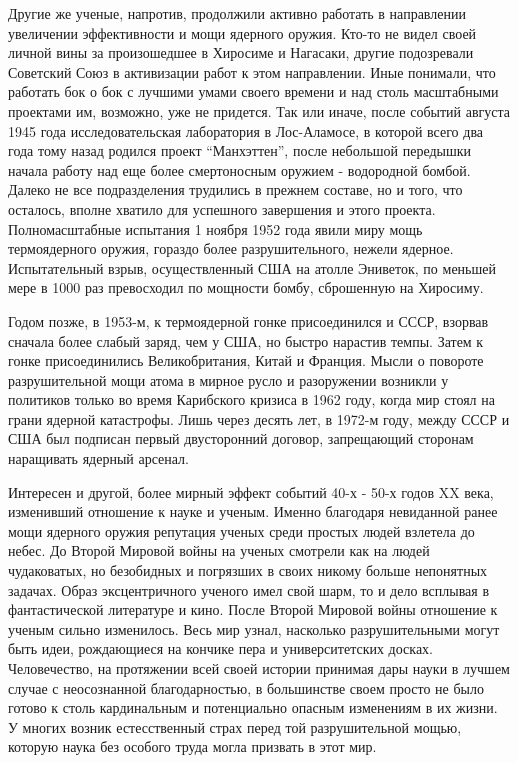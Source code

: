 Другие же ученые, напротив, продолжили активно работать в направлении увеличении эффективности и мощи ядерного оружия.
Кто-то не видел своей личной вины за произошедшее в Хиросиме и Нагасаки, другие подозревали Советский Союз в активизации работ к этом направлении.
Иные понимали, что работать бок о бок с лучшими умами своего времени и над столь масштабными проектами им, возможно, уже не придется. 
Так или иначе, после событий августа 1945 года исследовательская лаборатория в Лос-Аламосе, в которой всего два года тому назад родился проект ``Манхэттен'', после небольшой передышки начала работу над еще более смертоносным оружием - водородной бомбой.
Далеко не все подразделения трудились в прежнем составе, но и того, что осталось, вполне хватило для успешного завершения и этого проекта. 
Полномасштабные испытания 1 ноября 1952 года явили миру мощь термоядерного оружия, гораздо более разрушительного, нежели ядерное.
Испытательный взрыв, осуществленный США на атолле Эниветок, по меньшей мере в 1000 раз превосходил по мощности бомбу, сброшенную на Хиросиму.

Годом позже, в 1953-м, к термоядерной гонке присоединился и СССР, взорвав сначала более слабый заряд, чем у США, но быстро нарастив темпы. 
Затем к гонке присоединились Великобритания, Китай и Франция.
Мысли о повороте разрушительной мощи атома в мирное русло и разоружении возникли у политиков только во время Карибского кризиса в 1962 году, когда мир стоял на грани ядерной катастрофы. 
Лишь через десять лет, в 1972-м году, между СССР и США был подписан первый двусторонний договор, запрещающий сторонам наращивать ядерный арсенал.

Интересен и другой, более мирный эффект событий 40-х - 50-х годов XX века, изменивший отношение к науке и ученым.
Именно благодаря невиданной ранее мощи ядерного оружия репутация ученых среди простых людей взлетела до небес. 
До Второй Мировой войны на ученых смотрели как на людей чудаковатых, но безобидных и погрязших в своих никому больше непонятных задачах. 
Образ эксцентричного ученого имел свой шарм, то и дело всплывая в фантастической литературе и кино.
После Второй Мировой войны отношение к ученым сильно изменилось.
Весь мир узнал, насколько разрушительными могут быть идеи, рождающиеся на кончике пера и университетских досках.
Человечество, на протяжении всей своей истории принимая дары науки в лучшем случае с неосознанной благодарностью, в большинстве своем просто не было готово к столь кардинальным и потенциально опасным изменениям в их жизни.
У многих возник естесственный страх перед той разрушительной мощью, которую наука без особого труда могла призвать в этот мир. 

